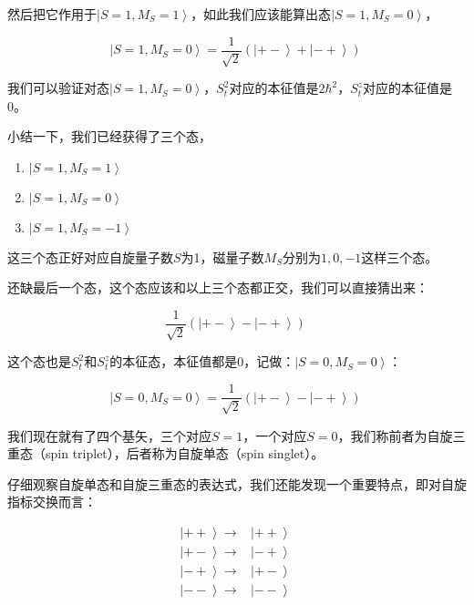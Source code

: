 然后把它作用于$\left| S=1, M_S =1 \right\rangle$，如此我们应该能算出态$\left| S=1, M_S =0 \right\rangle$，

\begin{equation}
\left| S=1, M_S =0 \right\rangle = \frac{1}{\sqrt{2}} \left( \left|+- \right\rangle + \left|-+ \right\rangle  \right)~
\end{equation}

我们可以验证对态$\left| S=1, M_S =0 \right\rangle$，$S_t^2$对应的本征值是$2 \hbar^2$，$S_t^z$对应的本征值是0。

小结一下，我们已经获得了三个态，

\begin{enumerate}
\item 

$\left| S=1, M_S =1 \right\rangle$

\item

$\left| S=1, M_S =0 \right\rangle$

\item

$\left| S=1, M_S =-1 \right\rangle $

\end{enumerate}

这三个态正好对应自旋量子数$S$为1，磁量子数$M_S$分别为$1, 0, -1$这样三个态。

还缺最后一个态，这个态应该和以上三个态都正交，我们可以直接猜出来：

\begin{equation}
\frac{1}{\sqrt{2}} \left( \left|+- \right\rangle - \left|-+ \right\rangle  \right)~
\end{equation}

这个态也是$S_t^2$和$S_t^z$的本征态，本征值都是0，记做：$\left|  S=0, M_S = 0 \right\rangle$：

\begin{equation}
\left|  S=0, M_S = 0 \right\rangle = \frac{1}{\sqrt{2}} \left( \left|+- \right\rangle - \left|-+ \right\rangle  \right)~
\end{equation}


我们现在就有了四个基矢，三个对应$S=1$，一个对应$S=0$，我们称前者为自旋三重态（spin triplet），后者称为自旋单态（spin singlet）。

仔细观察自旋单态和自旋三重态的表达式，我们还能发现一个重要特点，即对自旋指标交换而言：

\begin{align}
\left| + + \right\rangle  \to & \left| + + \right\rangle \\
\left| + - \right\rangle  \to & \left| - + \right\rangle \\
\left| - + \right\rangle  \to & \left|  + - \right\rangle \\
\left| - - \right\rangle  \to & \left| - - \right\rangle~
\end{align}

